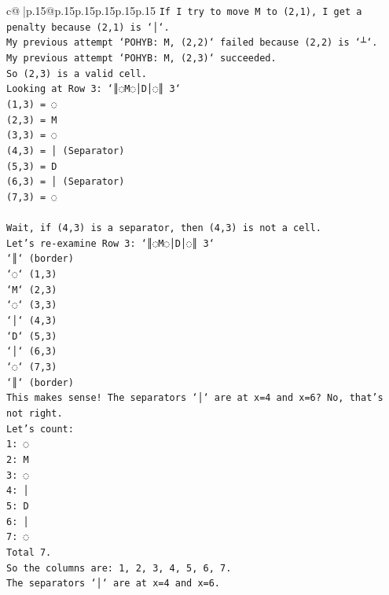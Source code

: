 \documentclass{article}
\begin{document}
{\begin{supertabular}{c@{$\;$}|p{.15\linewidth}@{}p{.15\linewidth}p{.15\linewidth}p{.15\linewidth}p{.15\linewidth}p{.15\linewidth}}
{{{\texttt{If I try to move M to (2,1), I get a penalty because (2,1) is `│`.} \\
\texttt{My previous attempt `POHYB: M, (2,2)` failed because (2,2) is `┴`.} \\
\texttt{My previous attempt `POHYB: M, (2,3)` succeeded.} \\
\texttt{So (2,3) is a valid cell.} \\
\texttt{Looking at Row 3: `║◌M◌│D│◌║ 3`} \\
\texttt{(1,3) = ◌} \\
\texttt{(2,3) = M} \\
\texttt{(3,3) = ◌} \\
\texttt{(4,3) = │ (Separator)} \\
\texttt{(5,3) = D} \\
\texttt{(6,3) = │ (Separator)} \\
\texttt{(7,3) = ◌} \\
\\ 
\texttt{Wait, if (4,3) is a separator, then (4,3) is not a cell.} \\
\texttt{Let's re{-}examine Row 3: `║◌M◌│D│◌║ 3`} \\
\texttt{`║` (border)} \\
\texttt{`◌` (1,3)} \\
\texttt{`M` (2,3)} \\
\texttt{`◌` (3,3)} \\
\texttt{`│` (4,3)} \\
\texttt{`D` (5,3)} \\
\texttt{`│` (6,3)} \\
\texttt{`◌` (7,3)} \\
\texttt{`║` (border)} \\
\texttt{This makes sense! The separators `│` are at x=4 and x=6? No, that's not right.} \\
\texttt{Let's count:} \\
\texttt{1: ◌} \\
\texttt{2: M} \\
\texttt{3: ◌} \\
\texttt{4: │} \\
\texttt{5: D} \\
\texttt{6: │} \\
\texttt{7: ◌} \\
\texttt{Total 7.} \\
\texttt{So the columns are: 1, 2, 3, 4, 5, 6, 7.} \\
\texttt{The separators `│` are at x=4 and x=6.} \\
}}}
\end{supertabular}}
\end{document}

